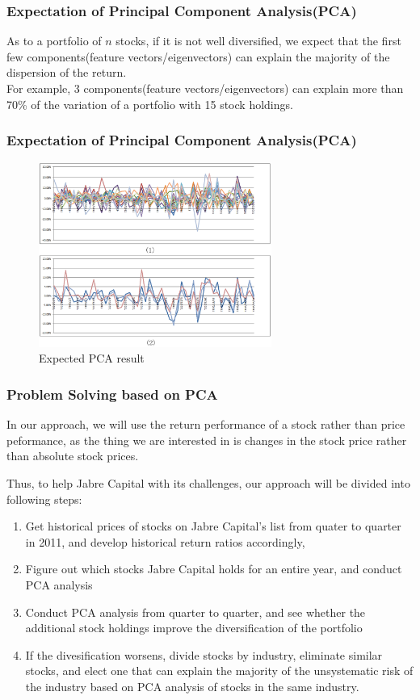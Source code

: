\documentclass[compress,handout,10pt]{beamer}
\let\olditem\item
\renewcommand{\item}{\setlength{\itemsep}{0.5\baselineskip}\olditem}
\begin{document}
\begin{frame}
    \frametitle{Expectation of Principal Component Analysis(PCA)}
As to a portfolio of $n$ stocks, if it is not well diversified, we expect that the first few components(feature vectors/eigenvectors) can explain the majority of the dispersion of the return. \\
For example, 3 components(feature vectors/eigenvectors) can explain more than 70\% of the variation of a portfolio with 15 stock holdings.
\end{frame}

\begin{frame}
    \frametitle{Expectation of Principal Component Analysis(PCA)}
\begin{figure}[h]
\begin{center}
\includegraphics[width=3in]{images/9.png}
\end{center}
\caption{Expected PCA result}
\label{fig:penguin}
\end{figure}
\end{frame}

\begin{frame}
    \frametitle{Problem Solving based on PCA}
In our approach, we will use the return performance of a stock rather than price peformance, as the thing we are interested in is changes in the stock price rather than absolute stock prices.

Thus, to help Jabre Capital with its challenges, our approach will be divided into following steps:
\begin{enumerate}
\item Get historical prices of stocks on Jabre Capital's list from quater to quarter in 2011, and develop historical return ratios accordingly,
\item Figure out which stocks Jabre Capital holds for an entire year, and conduct PCA analysis
\item Conduct PCA analysis from quarter to quarter, and see whether the additional stock holdings improve the diversification of the portfolio
\item If the divesification worsens, divide stocks by industry, eliminate similar stocks, and elect one that can explain the majority of the unsystematic risk of the industry based on PCA analysis of stocks in the same industry.
\end{enumerate}
\end{frame}
\end{document}
